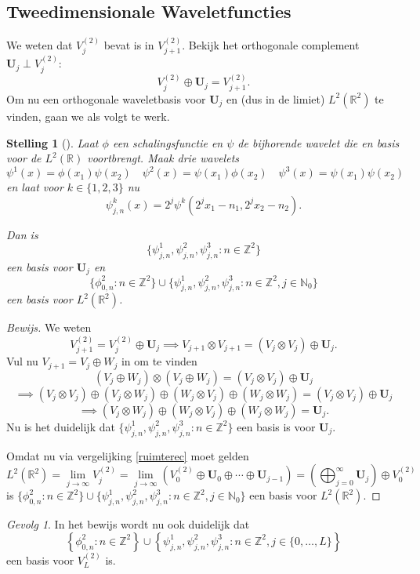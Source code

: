 \documentclass[11pt]{uvamath}
\newcommand{\R}{\mathbb{R}}
\newcommand{\N}{\mathbb{N}}
\newcommand{\Z}{\mathbb{Z}}
\theoremstyle{plain}
\newtheorem{stelling}{Stelling}[chapter]
\theoremstyle{definition}
\theoremstyle{remark}
\newtheorem{gevolg}{Gevolg}[stelling]
\begin{document}
\subsection{Tweedimensionale Waveletfuncties}
We weten dat $V_j^{(2)}$ bevat is in $V_{j+1}^{(2)}$. Bekijk het orthogonale complement $\boldsymbol{U}_j \perp V_j^{(2)}$:
\begin{equation}
  \label{2d_ruimte_rec}
  V_j^{(2)} \oplus \boldsymbol{U}_j = V_{j+1}^{(2)}.
\end{equation}
Om nu een orthogonale waveletbasis voor $\boldsymbol{U}_j$ en (dus in de limiet) $L^2(\R^2)$ te vinden, gaan we als volgt te werk.
\begin{stelling}[{\cite[T7.24]{mallat}}]
  Laat $\phi$ een schalingsfunctie en $\psi$ de bijhorende wavelet die en basis voor de $L^2(\R)$ voortbrengt. Maak drie wavelets
  \begin{equation}
    \label{psi_k_defs}
    \psi^1(x) = \phi(x_1)\psi(x_2) \quad \psi^2(x) = \psi(x_1) \phi(x_2) \quad \psi^3(x) = \psi(x_1)\psi(x_2)
  \end{equation}
  en laat voor $k \in \{1,2,3\}$ nu
  \[
  \psi^k_{j,n}(x) = 2^j \psi^k\left( 2^jx_1 - n_1, 2^j x_2 - n_2 \right).
  \]

  Dan is
  \[
  \{ \psi^1_{j,n}, \psi^2_{j,n}, \psi^3_{j,n}: n \in \Z^2 \}
  \] een basis voor $\boldsymbol{U}_j$
  en
  \[
  \{ \phi_{0, n}^2: n \in \Z^2 \} \cup \{ \psi^1_{j,n}, \psi^2_{j,n}, \psi^3_{j,n}: n \in \Z^2, j \in \N_0 \}
  \] een basis voor $L^2(\R^2)$.
\end{stelling}
\begin{proof}[Bewijs]
  We weten
  \[
  V_{j+1}^{(2)} = V_j^{(2)} \oplus \boldsymbol{U}_j \implies V_{j+1} \otimes V_{j+1} = ( V_j \otimes V_j ) \oplus \boldsymbol{U}_j.
  \]
  Vul nu $V_{j+1} = V_j \oplus W_j$ in om te vinden
  \[
  ( V_j \oplus W_j ) \otimes (V_j \oplus W_j ) = (V_j \otimes V_j) \oplus \boldsymbol{U}_j
  \]
  \[
  \implies (V_j \otimes V_j) \oplus (V_j \otimes W_j) \oplus (W_j \otimes V_j) \oplus (W_j \otimes W_j) = (V_j \otimes V_j) \oplus \boldsymbol{U}_j
  \]
  \[
  \implies (V_j \otimes W_j) \oplus (W_j \otimes V_j) \oplus (W_j \otimes W_j) = \boldsymbol{U}_j.
  \]
  Nu is het duidelijk dat $\{ \psi^1_{j,n}, \psi^2_{j,n}, \psi^3_{j,n}: n \in \Z^2 \}$ een basis is voor $\boldsymbol{U}_j$.

Omdat nu via vergelijking \ref{ruimterec} moet gelden
\[
	L^2(\R^2) = \lim_{j \to \infty} V_j^{(2)} = \lim_{j \to \infty} ( V_0^{(2)} \oplus \boldsymbol{U}_0 \oplus \cdots \oplus \boldsymbol{U}_{j-1} ) = \left( \bigoplus_{j=0}^\infty \boldsymbol{U}_j \right) \oplus V_0^{(2)}
\]
is $\{ \phi_{0, n}^2: n \in \Z^2 \} \cup \{ \psi^1_{j,n}, \psi^2_{j,n}, \psi^3_{j,n}: n \in \Z^2, j \in \N_0 \}$ een basis voor $L^2(\R^2)$.
\end{proof}
\begin{gevolg}
In het bewijs wordt nu ook duidelijk dat 
\[
	\left\{ \phi_{0, n}^2: n \in \Z^2 \right\} \cup \left\{ \psi^1_{j,n}, \psi^2_{j,n}, \psi^3_{j,n}: n \in \Z^2, j \in \{0, \ldots, L \}  \right\}
\]
een basis voor $V_L^{(2)}$ is.
\end{gevolg}
\end{document}

